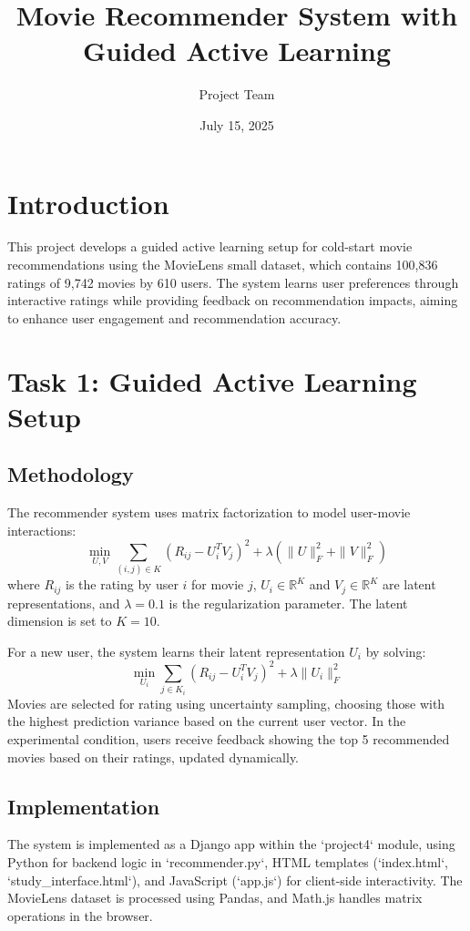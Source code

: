 \documentclass{article}
\begin{document}
\title{Movie Recommender System with Guided Active Learning}
\author{Project Team}
\date{July 15, 2025}
\maketitle

\section{Introduction}
This project develops a guided active learning setup for cold-start movie recommendations using the MovieLens small dataset, which contains 100,836 ratings of 9,742 movies by 610 users. The system learns user preferences through interactive ratings while providing feedback on recommendation impacts, aiming to enhance user engagement and recommendation accuracy.

\section{Task 1: Guided Active Learning Setup}
\subsection{Methodology}
The recommender system uses matrix factorization to model user-movie interactions:
\[
\min_{U,V} \sum_{(i,j) \in K} (R_{ij} - U_i^T V_j)^2 + \lambda (\|U\|_F^2 + \|V\|_F^2)
\]
where $R_{ij}$ is the rating by user $i$ for movie $j$, $U_i \in \mathbb{R}^K$ and $V_j \in \mathbb{R}^K$ are latent representations, and $\lambda = 0.1$ is the regularization parameter. The latent dimension is set to $K = 10$.

For a new user, the system learns their latent representation $U_i$ by solving:
\[
\min_{U_i} \sum_{j \in K_i} (R_{ij} - U_i^T V_j)^2 + \lambda \|U_i\|_F^2
\]
Movies are selected for rating using uncertainty sampling, choosing those with the highest prediction variance based on the current user vector. In the experimental condition, users receive feedback showing the top 5 recommended movies based on their ratings, updated dynamically.

\subsection{Implementation}
The system is implemented as a Django app within the `project4` module, using Python for backend logic in `recommender.py`, HTML templates (`index.html`, `study_interface.html`), and JavaScript (`app.js`) for client-side interactivity. The MovieLens dataset is processed using Pandas, and Math.js handles matrix operations in the browser.
\end{document}
